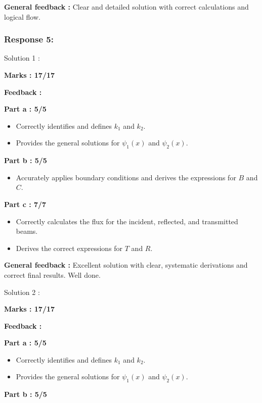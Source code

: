 \documentclass[a4paper,11pt]{article}
\begin{document}
\textbf{General feedback :}
Clear and detailed solution with correct calculations and logical flow.



\subsubsection*{Response 5:}

Solution 1 :

\textbf{Marks : 17/17}

\textbf{Feedback :}

\textbf{Part a : 5/5}

\begin{itemize}
    \item Correctly identifies and defines $k_1$ and $k_2$.
    \item Provides the general solutions for $\psi_1 (x)$ and $\psi_2 (x)$.
\end{itemize}

\textbf{Part b : 5/5}

\begin{itemize}
    \item Accurately applies boundary conditions and derives the expressions for $B$ and $C$.
\end{itemize}

\textbf{Part c : 7/7}

\begin{itemize}
    \item Correctly calculates the flux for the incident, reflected, and transmitted beams.
    \item Derives the correct expressions for $T$ and $R$.
\end{itemize}

\textbf{General feedback :}
Excellent solution with clear, systematic derivations and correct final results. Well done.


Solution 2 :

\textbf{Marks : 17/17}

\textbf{Feedback :}

\textbf{Part a : 5/5}

\begin{itemize}
    \item Correctly identifies and defines $k_1$ and $k_2$.
    \item Provides the general solutions for $\psi_1 (x)$ and $\psi_2 (x)$.
\end{itemize}

\textbf{Part b : 5/5}
\end{document}

